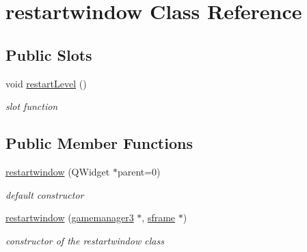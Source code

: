 \hypertarget{classrestartwindow}{\section{restartwindow \-Class \-Reference}
\label{classrestartwindow}
}
\subsection*{\-Public \-Slots}
\begin{DoxyCompactItemize}
\item 
void \hyperlink{classrestartwindow_a52f7c83fd104bf9f64959f113d0cba33}{restart\-Level} ()
\begin{DoxyCompactList}\small\item\em slot function \end{DoxyCompactList}\end{DoxyCompactItemize}
\subsection*{\-Public \-Member \-Functions}
\begin{DoxyCompactItemize}
\item 
\hypertarget{classrestartwindow_a8e2382e52f34a9059049e15d0ec4aa36}{\hyperlink{classrestartwindow_a8e2382e52f34a9059049e15d0ec4aa36}{restartwindow} (\-Q\-Widget $\ast$parent=0)}\label{classrestartwindow_a8e2382e52f34a9059049e15d0ec4aa36}

\begin{DoxyCompactList}\small\item\em default constructor \end{DoxyCompactList}\item 
\hyperlink{classrestartwindow_a06b20f51dcde1f056f7777eaff434bd2}{restartwindow} (\hyperlink{classgamemanager3}{gamemanager3} $\ast$, \hyperlink{classsframe}{sframe} $\ast$)
\begin{DoxyCompactList}\small\item\em constructor of the restartwindow class \end{DoxyCompactList}\end{DoxyCompactItemize}
